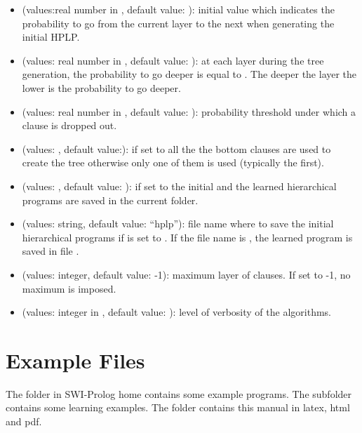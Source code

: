 \documentclass[letterpaper,10pt,english]{sphinxmanual}
\begin{document}
\begin{itemize}
\begin{itemize}
\item {} 
 (values:real number in \sphinxcode{{[}0,1{]}} , default value: ): initial value which indicates the probability to go from the current layer to the next when generating the initial HPLP.

\item {} 
 (values: real number in \sphinxcode{{[}0,1{]}}, default value: ): at each layer during the tree generation, the probability to go deeper is equal to . The deeper the layer the lower is the probability to go deeper.

\item {} 
 (values: real number in \sphinxcode{{[}0,1{]}}, default value: ):  probability threshold under which a clause is dropped out.

\item {} 
 (values:  , default value:): if set to  all the the bottom clauses are used to create the tree otherwise only one of them is used (typically the first).

\item {} 
 (values: , default value: ): if set to  the initial and the learned hierarchical programs are saved in the current folder.

\item {} 
 (values: string, default value: “hplp”): file name where to save the initial hierarchical programs if   is set to . If the file name is , the learned program is saved in file .

\item {} 
 (values: integer, default value: -1): maximum layer of clauses. If set to -1, no maximum is imposed.

\item {} 
 (values: integer in \sphinxcode{{[}1,3{]}}, default value: ): level of verbosity of the algorithms.

\end{itemize}

\end{itemize}


\chapter{Example Files}
\label{\detokenize{index:example-files}}
The  folder in SWI-Prolog home contains some example programs.
The subfolder  contains some learning examples.
The  folder contains this manual in latex, html and pdf.
\end{document}
